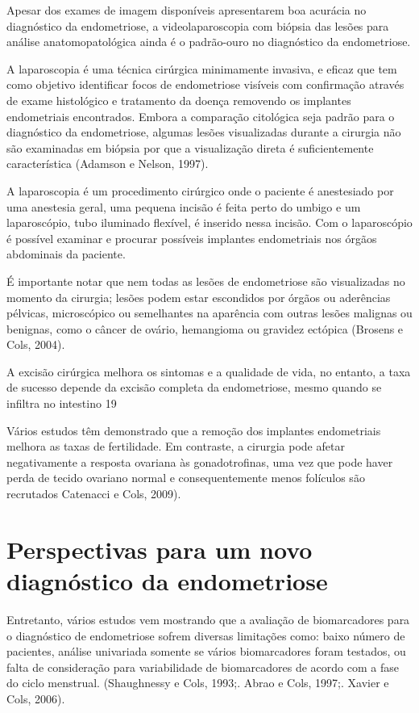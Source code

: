 \documentclass[12pt]{article} %
\begin{document}
Apesar dos exames de imagem disponíveis apresentarem boa acurácia no diagnóstico da endometriose, a videolaparoscopia com biópsia das lesões para análise anatomopatológica ainda é o padrão-ouro no diagnóstico da endometriose.

A laparoscopia é uma técnica cirúrgica minimamente invasiva, e eficaz que tem como objetivo  identificar focos de endometriose visíveis com confirmação através de exame histológico e tratamento da doença removendo os implantes endometriais encontrados. Embora a comparação citológica seja padrão para
o diagnóstico da endometriose, algumas lesões visualizadas durante a
cirurgia não são examinadas em biópsia por que a visualização direta é
suficientemente característica (Adamson e Nelson, 1997). 

A laparoscopia é um procedimento cirúrgico onde o paciente é
anestesiado por uma anestesia geral, uma pequena incisão é feita
perto do umbigo e um laparoscópio, tubo iluminado flexível, é inserido
nessa incisão. Com o laparoscópio é possível examinar e procurar
possíveis implantes endometriais nos órgãos abdominais da paciente.

É importante notar que nem todas as lesões de endometriose são
visualizadas no momento da cirurgia; lesões podem estar escondidos por
órgãos ou aderências pélvicas, microscópico ou semelhantes na
aparência com outras lesões malignas ou benignas, como o câncer de
ovário, hemangioma ou gravidez ectópica (Brosens e Cols, 2004).

A excisão cirúrgica
melhora os sintomas e a qualidade de vida, no entanto, a taxa de
sucesso depende da excisão completa da endometriose, mesmo
quando se infiltra no intestino 19

Vários estudos têm demonstrado que a remoção dos implantes
endometriais melhora as taxas de fertilidade. Em contraste, a
cirurgia pode afetar negativamente a resposta ovariana às gonadotrofinas, uma vez que pode haver perda de tecido ovariano normal e consequentemente menos folículos são recrutados Catenacci e Cols, 2009).


\section{Perspectivas para um novo diagnóstico da endometriose}

Entretanto, vários estudos vem mostrando que a avaliação de biomarcadores para o diagnóstico de endometriose sofrem diversas limitações como: baixo número de pacientes, análise univariada somente se vários biomarcadores foram testados, ou falta de consideração para variabilidade de biomarcadores de acordo com a fase do ciclo menstrual. (Shaughnessy e Cols, 1993;. Abrao e Cols, 1997;. Xavier e Cols, 2006).
\end{document}
